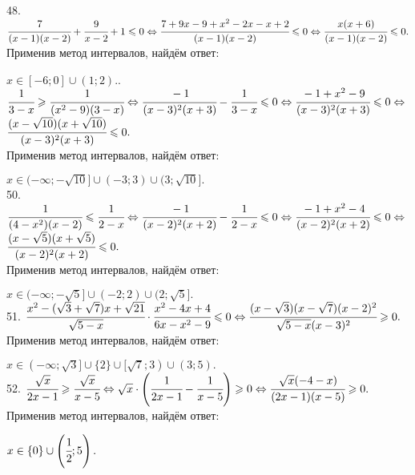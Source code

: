 48. $\cfrac{7}{(x-1)(x-2)}+\cfrac{9}{x-2}+1\leqslant0\Leftrightarrow \cfrac{7+9x-9+x^2-2x-x+2}{(x-1)(x-2)}\leqslant0
\Leftrightarrow \cfrac{x(x+6)}{(x-1)(x-2)}\leqslant0.$ Применив метод интервалов, найдём ответ:
\begin{figure}[ht!]
\end{figure}
$x\in[-6;0]\cup(1;2).$\newpage{}. $\cfrac{1}{3-x}\geqslant\cfrac{1}{(x^2-9)(3-x)}\Leftrightarrow\cfrac{-1}{(x-3)^2(x+3)}-\cfrac{1}{3-x}\leqslant0\Leftrightarrow
\cfrac{-1+x^2-9}{(x-3)^2(x+3)}\leqslant0\Leftrightarrow$\\$\cfrac{(x-\sqrt{10})(x+\sqrt{10})}{(x-3)^2(x+3)}\leqslant0.$\\ Применив метод интервалов, найдём ответ:
\begin{figure}[ht!]
\end{figure}
$x\in(-\infty;-\sqrt{10}]\cup(-3;3)\cup(3;\sqrt{10}].$\\
50. $\cfrac{1}{(4-x^2)(x-2)}\leqslant\cfrac{1}{2-x} \Leftrightarrow\cfrac{-1}{(x-2)^2(x+2)}-\cfrac{1}{2-x}\leqslant0\Leftrightarrow
\cfrac{-1+x^2-4}{(x-2)^2(x+2)}\leqslant0\Leftrightarrow$\\$\cfrac{(x-\sqrt{5})(x+\sqrt{5})}{(x-2)^2(x+2)}\leqslant0.$\\ Применив метод интервалов, найдём ответ:
\begin{figure}[ht!]
\end{figure}
$x\in(-\infty;-\sqrt{5}]\cup(-2;2)\cup(2;\sqrt{5}].$\\
51. $\cfrac{x^2-(\sqrt{3}+\sqrt{7})x+\sqrt{21}}{\sqrt{5-x}}\cdot\cfrac{x^2-4x+4}{6x-x^2-9}\leqslant 0\Leftrightarrow
\cfrac{(x-\sqrt{3})(x-\sqrt{7})(x-2)^2}{\sqrt{5-x}(x-3)^2}\geqslant 0.$ Применив метод интервалов, найдём ответ:
\begin{figure}[ht!]
\end{figure}
$x\in(-\infty;\sqrt{3}]\cup\{2\}\cup[\sqrt{7};3)\cup(3;5).$\\
52. $\cfrac{\sqrt{x}}{2x-1}\geqslant\cfrac{\sqrt{x}}{x-5}\Leftrightarrow\sqrt{x}\cdot\left(\cfrac{1}{2x-1}-\cfrac{1}{x-5}\right)\geqslant0\Leftrightarrow
\cfrac{\sqrt{x}(-4-x)}{(2x-1)(x-5)}\geqslant0.$ Применив метод интервалов, найдём ответ:
\begin{figure}[ht!]
\end{figure}
$x\in\{0\}\cup\left(\cfrac{1}{2};5\right).$\\
